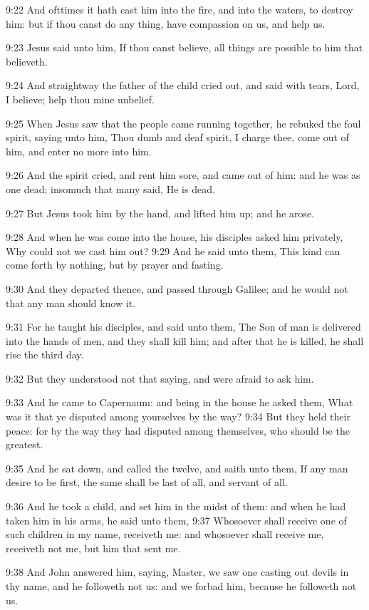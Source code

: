 9:22 And ofttimes it hath cast him into the fire, and into the waters,
to destroy him: but if thou canst do any thing, have compassion on us,
and help us.

9:23 Jesus said unto him, If thou canst believe, all things are
possible to him that believeth.

9:24 And straightway the father of the child cried out, and said with
tears, Lord, I believe; help thou mine unbelief.

9:25 When Jesus saw that the people came running together, he rebuked
the foul spirit, saying unto him, Thou dumb and deaf spirit, I charge
thee, come out of him, and enter no more into him.

9:26 And the spirit cried, and rent him sore, and came out of him: and
he was as one dead; insomuch that many said, He is dead.

9:27 But Jesus took him by the hand, and lifted him up; and he arose.

9:28 And when he was come into the house, his disciples asked him
privately, Why could not we cast him out?  9:29 And he said unto them,
This kind can come forth by nothing, but by prayer and fasting.

9:30 And they departed thence, and passed through Galilee; and he
would not that any man should know it.

9:31 For he taught his disciples, and said unto them, The Son of man
is delivered into the hands of men, and they shall kill him; and after
that he is killed, he shall rise the third day.

9:32 But they understood not that saying, and were afraid to ask him.

9:33 And he came to Capernaum: and being in the house he asked them,
What was it that ye disputed among yourselves by the way?  9:34 But
they held their peace: for by the way they had disputed among
themselves, who should be the greatest.

9:35 And he sat down, and called the twelve, and saith unto them, If
any man desire to be first, the same shall be last of all, and servant
of all.

9:36 And he took a child, and set him in the midst of them: and when
he had taken him in his arms, he said unto them, 9:37 Whosoever shall
receive one of such children in my name, receiveth me: and whosoever
shall receive me, receiveth not me, but him that sent me.

9:38 And John answered him, saying, Master, we saw one casting out
devils in thy name, and he followeth not us: and we forbad him,
because he followeth not us.

